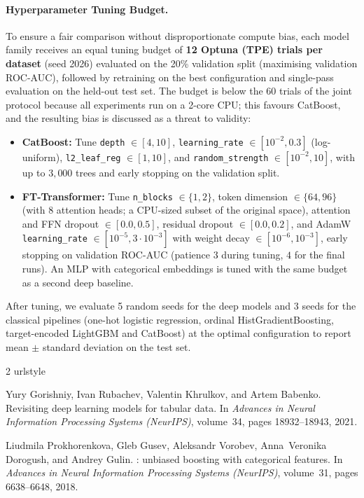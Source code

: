 \documentclass[twoside,11pt]{article}
\begin{document}
\paragraph{Hyperparameter Tuning Budget.}
To ensure a fair comparison without disproportionate compute bias, each model family receives an equal tuning budget of \textbf{12 Optuna (TPE) trials per dataset} (seed 2026) evaluated on the 20\% validation split (maximising validation ROC-AUC), followed by retraining on the best configuration and single-pass evaluation on the held-out test set. The budget is below the 60 trials of the joint protocol because all experiments run on a 2-core CPU; this favours CatBoost, and the resulting bias is discussed as a threat to validity:
\begin{itemize}[leftmargin=*, nosep, topsep=2pt]
    \item \textbf{CatBoost:} Tune \texttt{depth} $\in [4, 10]$, \texttt{learning\_rate} $\in [10^{-2}, 0.3]$ (log-uniform), \texttt{l2\_leaf\_reg} $\in [1, 10]$, and \texttt{random\_strength} $\in [10^{-2}, 10]$, with up to $3{,}000$ trees and early stopping on the validation split.
    \item \textbf{FT-Transformer:} Tune \texttt{n\_blocks} $\in \{1, 2\}$, token dimension $\in \{64, 96\}$ (with $8$ attention heads; a CPU-sized subset of the original space), attention and FFN dropout $\in [0.0, 0.5]$, residual dropout $\in [0.0, 0.2]$, and AdamW \texttt{learning\_rate} $\in [10^{-5}, 3\cdot10^{-3}]$ with weight decay $\in [10^{-6}, 10^{-3}]$, early stopping on validation ROC-AUC (patience $3$ during tuning, $4$ for the final runs). An MLP with categorical embeddings is tuned with the same budget as a second deep baseline.
\end{itemize}
After tuning, we evaluate 5 random seeds for the deep models and 3 seeds for the classical pipelines (one-hot logistic regression, ordinal HistGradientBoosting, target-encoded LightGBM and CatBoost) at the optimal configuration to report mean $\pm$ standard deviation on the test set.

\begin{thebibliography}{2}
\providecommand{\natexlab}[1]{#1}
\providecommand{\url}[1]{\texttt{#1}}
\expandafter\ifx\csname urlstyle\endcsname\relax
  \providecommand{\doi}[1]{doi: #1}\else
  \providecommand{\doi}{doi: \begingroup \urlstyle{rm}\Url}\fi

Yury Gorishniy, Ivan Rubachev, Valentin Khrulkov, and Artem Babenko.
\newblock Revisiting deep learning models for tabular data.
\newblock In \emph{Advances in Neural Information Processing Systems (NeurIPS)}, volume~34, pages 18932--18943, 2021.

Liudmila Prokhorenkova, Gleb Gusev, Aleksandr Vorobev, Anna~Veronika Dorogush, and Andrey Gulin.
: unbiased boosting with categorical features.
\newblock In \emph{Advances in Neural Information Processing Systems (NeurIPS)}, volume~31, pages 6638--6648, 2018.

\end{thebibliography}
\end{document}
